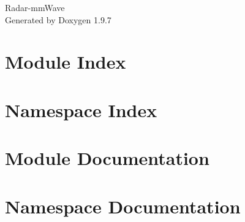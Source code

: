 \documentclass[twoside]{book}
\newcommand{\+}{\discretionary{\mbox{\scriptsize$\hookleftarrow$}}{}{}}
\newcommand{\clearemptydoublepage}{%
    \newpage{\pagestyle{empty}\cleardoublepage}%
  }
\begin{document}
  \raggedbottom
    \hypersetup{pageanchor=false,
                bookmarksnumbered=true,
                pdfencoding=unicode
               }
  \begin{titlepage}
  \vspace*{7cm}
  \begin{center}%
  {\Large Radar-\/mm\+Wave}\\
  \vspace*{1cm}
  {\large Generated by Doxygen 1.9.7}\\
  \end{center}
  \end{titlepage}
  \clearemptydoublepage
  \tableofcontents
  \clearemptydoublepage
  \hypersetup{pageanchor=true}

\chapter{Module Index}

\chapter{Namespace Index}

\chapter{Module Documentation}




\chapter{Namespace Documentation}

  \backmatter
  \newpage
  \clearemptydoublepage
  \printindex
\end{document}
